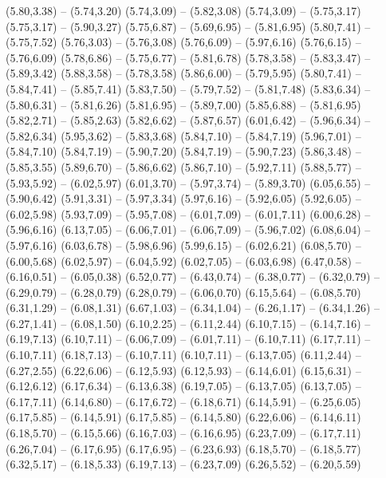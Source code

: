 {  (5.80,3.38) -- (5.74,3.20)
  (5.74,3.09) -- (5.82,3.08)
  (5.74,3.09) -- (5.75,3.17)
  (5.75,3.17) -- (5.90,3.27)
  (5.75,6.87) -- (5.69,6.95) -- (5.81,6.95)
  (5.80,7.41) -- (5.75,7.52)
  (5.76,3.03) -- (5.76,3.08)
  (5.76,6.09) -- (5.97,6.16)
  (5.76,6.15) -- (5.76,6.09)
  (5.78,6.86) -- (5.75,6.77) -- (5.81,6.78)
  (5.78,3.58) -- (5.83,3.47) -- (5.89,3.42)
  (5.88,3.58) -- (5.78,3.58)
  (5.86,6.00) -- (5.79,5.95)
  (5.80,7.41) -- (5.84,7.41) -- (5.85,7.41)
  (5.83,7.50) -- (5.79,7.52) -- (5.81,7.48)
  (5.83,6.34) -- (5.80,6.31) -- (5.81,6.26)
  (5.81,6.95) -- (5.89,7.00)
  (5.85,6.88) -- (5.81,6.95)
  (5.82,2.71) -- (5.85,2.63)
  (5.82,6.62) -- (5.87,6.57)
  (6.01,6.42) -- (5.96,6.34) -- (5.82,6.34)
  (5.95,3.62) -- (5.83,3.68)
  (5.84,7.10) -- (5.84,7.19)
  (5.96,7.01) -- (5.84,7.10)
  (5.84,7.19) -- (5.90,7.20)
  (5.84,7.19) -- (5.90,7.23)
  (5.86,3.48) -- (5.85,3.55)
  (5.89,6.70) -- (5.86,6.62)
  (5.86,7.10) -- (5.92,7.11)
  (5.88,5.77) -- (5.93,5.92) -- (6.02,5.97)
  (6.01,3.70) -- (5.97,3.74) -- (5.89,3.70)
  (6.05,6.55) -- (5.90,6.42)
  (5.91,3.31) -- (5.97,3.34)
  (5.97,6.16) -- (5.92,6.05)
  (5.92,6.05) -- (6.02,5.98)
  (5.93,7.09) -- (5.95,7.08) -- (6.01,7.09) -- (6.01,7.11)
  (6.00,6.28) -- (5.96,6.16)
  (6.13,7.05) -- (6.06,7.01) -- (6.06,7.09) -- (5.96,7.02)
  (6.08,6.04) -- (5.97,6.16)
  (6.03,6.78) -- (5.98,6.96)
  (5.99,6.15) -- (6.02,6.21)
  (6.08,5.70) -- (6.00,5.68)
  (6.02,5.97) -- (6.04,5.92)
  (6.02,7.05) -- (6.03,6.98)
  (6.47,0.58) -- (6.16,0.51) -- (6.05,0.38)
  (6.52,0.77) -- (6.43,0.74) -- (6.38,0.77) -- (6.32,0.79) -- (6.29,0.79) -- (6.28,0.79)
  (6.28,0.79) -- (6.06,0.70)
  (6.15,5.64) -- (6.08,5.70)
  (6.31,1.29) -- (6.08,1.31)
  (6.67,1.03) -- (6.34,1.04) -- (6.26,1.17) -- (6.34,1.26) -- (6.27,1.41) -- (6.08,1.50)
  (6.10,2.25) -- (6.11,2.44)
  (6.10,7.15) -- (6.14,7.16) -- (6.19,7.13)
  (6.10,7.11) -- (6.06,7.09) -- (6.01,7.11) -- (6.10,7.11)
  (6.17,7.11) -- (6.10,7.11)
  (6.18,7.13) -- (6.10,7.11)
  (6.10,7.11) -- (6.13,7.05)
  (6.11,2.44) -- (6.27,2.55)
  (6.22,6.06) -- (6.12,5.93)
  (6.12,5.93) -- (6.14,6.01)
  (6.15,6.31) -- (6.12,6.12)
  (6.17,6.34) -- (6.13,6.38)
  (6.19,7.05) -- (6.13,7.05)
  (6.13,7.05) -- (6.17,7.11)
  (6.14,6.80) -- (6.17,6.72) -- (6.18,6.71)
  (6.14,5.91) -- (6.25,6.05)
  (6.17,5.85) -- (6.14,5.91)
  (6.17,5.85) -- (6.14,5.80)
  (6.22,6.06) -- (6.14,6.11)
  (6.18,5.70) -- (6.15,5.66)
  (6.16,7.03) -- (6.16,6.95)
  (6.23,7.09) -- (6.17,7.11)
  (6.26,7.04) -- (6.17,6.95)
  (6.17,6.95) -- (6.23,6.93)
  (6.18,5.70) -- (6.18,5.77)
  (6.32,5.17) -- (6.18,5.33)
  (6.19,7.13) -- (6.23,7.09)
  (6.26,5.52) -- (6.20,5.59)
}
